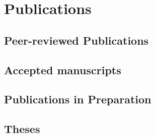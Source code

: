 \ifacademic
  \section{Publications}
  
  \subsection{Peer-reviewed Publications}
    \begin{refsection}
      \vspace{2mm}
      \onehalfspacing
      \nocite{
        Worman2020
        DiBaldassarre2018,
        Breinl2017,
        GironsLopez2017,
        GironsLopez2016a,
        Mbanguka2016,
        GironsLopez2015
      }
      \printbibliography[heading=none]
    \end{refsection}

  \subsection{Accepted manuscripts}
    \begin{refsection}
      \vspace{2mm}
      \onehalfspacing
      \nocite{
        GironsLopez2020,
      }
      \printbibliography[heading=none]
    \end{refsection}
    
  \subsection{Publications in Preparation}
    \begin{refsection}
      \vspace{2mm}
      \onehalfspacing
      \nocite{
        GironsLopez2020a,
      }
      \printbibliography[heading=none]
    \end{refsection}
  
  \subsection{Theses}
    \begin{refsection}
      \vspace{2mm}
      \onehalfspacing
      \nocite{
        GironsLopez2016,
        GironsLopez2011
      }
      \printbibliography[heading=none]
    \end{refsection}
  
  \newpage


